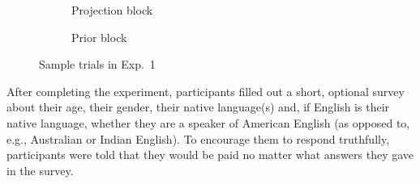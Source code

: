 \documentclass[11pt,fleqn]{article}
\newcommand{\6}{\mbox{$[\hspace*{-.6mm}[$}}
\newcommand{\9}{\mbox{$]\hspace*{-.6mm}]$}}
\begin{document}
\begin{figure}[h!]
\centering

\begin{subfigure}[t]{0.5\textwidth}
\centering
{} 
\caption{Projection block}\label{fig-exp1-projection}
 \end{subfigure}%
\begin{subfigure}[t]{0.5\textwidth}
        \centering
{}
\caption{Prior block}\label{f-exp1-prior}
\end{subfigure}
\caption{Sample trials in Exp.~1}
\end{figure}

After completing the experiment, participants filled out a short, optional survey about their age, their gender, their native language(s) and, if English is their native language, whether they are a speaker of American English (as opposed to, e.g., Australian or Indian English). To encourage them to respond truthfully, participants were told that they would be paid no matter what answers they gave in the survey.
\end{document}

